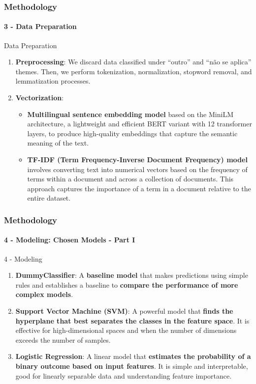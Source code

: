 \begin{frame}
	\frametitle{Methodology}
	\framesubtitle{3 - Data Preparation}	

	\begin{block}{Data Preparation} 
		\begin{enumerate}

			\item \textbf{Preprocessing}: We discard data classified under ``outro'' and ``não se aplica'' themes. Then, we perform tokenization, normalization, stopword removal, and lemmatization processes.
			
			\item \textbf{Vectorization}:
			\begin{itemize}
				\item \textbf{Multilingual sentence embedding model} based on the MiniLM architecture, a lightweight and efficient BERT variant with 12 transformer layers, to produce high-quality embeddings that capture the semantic meaning of the text. 
				
				\item \textbf{TF-IDF (Term Frequency-Inverse Document Frequency) model} involves converting text into numerical vectors based on the frequency of terms within a document and across a collection of documents. This approach captures the importance of a term in a document relative to the entire dataset.
			\end{itemize}
		\end{enumerate}
	\end{block}
\end{frame}
\begin{frame}
	\frametitle{Methodology}
	\framesubtitle{4 - Modeling: Chosen Models - Part I}	
	
	\begin{block}{4 - Modeling} 
		\begin{enumerate}
			\item \textbf{DummyClassifier}: A \textbf{baseline model} that makes predictions using simple rules and establishes a baseline to \textbf{compare the performance of more complex models}.
			
			\item \textbf{Support Vector Machine (SVM)}: A powerful model that \textbf{finds the hyperplane that best separates the classes in the feature space}. It is  effective for high-dimensional spaces and when the number of dimensions exceeds the number of samples.
			
			\item \textbf{Logistic Regression}: A linear model that \textbf{estimates the probability of a binary outcome based on input features}. It is simple and interpretable, good for linearly separable data and understanding feature importance.
		\end{enumerate}
	\end{block}
\end{frame}
